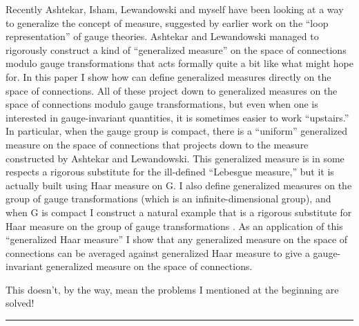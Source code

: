 Recently Ashtekar, Isham, Lewandowski and myself have been looking at a
way to generalize the concept of measure, suggested by earlier work on
the ``loop representation'' of gauge theories.  Ashtekar and Lewandowski
managed to rigorously construct a kind of ``generalized measure'' on the
space of connections modulo gauge transformations that acts formally
quite a bit like what might hope for.  In this paper I show how can
define generalized measures directly on the space of connections.  All
of these project down to generalized measures on the space of
connections modulo gauge transformations, but even when one is
interested in gauge-invariant quantities, it is sometimes easier to work
``upstairs.''  In particular, when the gauge group is compact, there is
a ``uniform'' generalized measure on the space of connections that
projects down to the measure constructed by Ashtekar and Lewandowski.
This generalized measure is in some respects a rigorous substitute for
the ill-defined ``Lebesgue measure,'' but it is actually built using
Haar measure on G.  I also define generalized measures on the group of
gauge transformations (which is an infinite-dimensional group), and when
G is compact I construct a natural example that is a rigorous substitute
for Haar measure on the group of gauge transformations .  As an
application of this ``generalized Haar measure'' I show that any
generalized measure on the space of connections can be averaged against
generalized Haar measure to give a gauge-invariant generalized measure
on the space of connections.

This doesn't, by the way, mean the problems I mentioned at the beginning
are solved!
\par\noindent\rule{\textwidth}{0.4pt}

